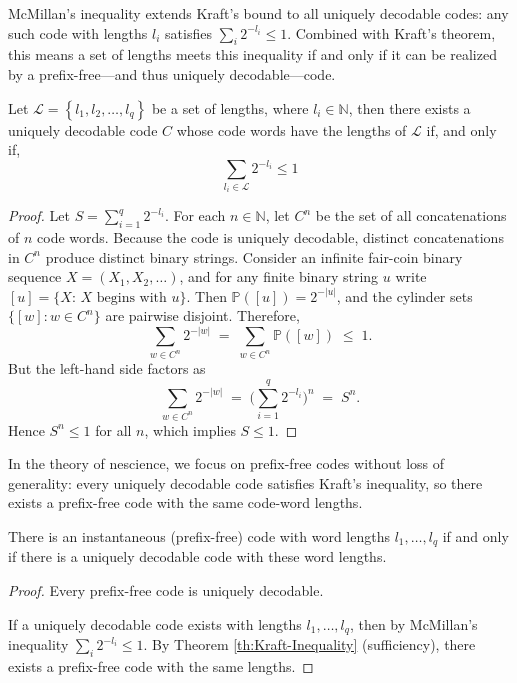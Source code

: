 McMillan's inequality extends Kraft's bound to all uniquely decodable codes: any such code with lengths \(l_i\) satisfies \(\sum_i 2^{-l_i}\le 1\). Combined with Kraft's theorem, this means a set of lengths meets this inequality if and only if it can be realized by a prefix-free---and thus uniquely decodable---code.

\begin{theorem}
\label{th:McMillan-Inequality}
Let $\mathcal{L}=\left\{ l_{1},l_{2},\ldots,l_{q}\right\}$ be a set of lengths, where $l_{i}\in\mathbb{N}$, then there exists a uniquely decodable code $C$ whose code words have the lengths of $\mathcal{L}$ if, and only if,
\[
\sum_{l_{i}\in\mathcal{L}}2^{-l_{i}} \leq 1
\]
\end{theorem}
\begin{proof}
Let $S=\sum_{i=1}^q 2^{-l_i}$. For each $n\in\mathbb{N}$, let $C^n$ be the set of all concatenations of $n$ code words. Because the code is uniquely decodable, distinct concatenations in $C^n$ produce distinct binary strings. Consider an infinite fair-coin binary sequence $X=(X_1,X_2,\ldots)$, and for any finite binary string $u$ write $[u]=\{X:\, X \text{ begins with } u\}$. Then $\mathbb{P}([u])=2^{-|u|}$, and the cylinder sets $\{[w]: w\in C^n\}$ are pairwise disjoint. Therefore,
\[
\sum_{w\in C^n} 2^{-|w|} \;=\; \sum_{w\in C^n} \mathbb{P}([w]) \;\le\; 1.
\]
But the left-hand side factors as
\[
\sum_{w\in C^n} 2^{-|w|} \;=\; \Big(\sum_{i=1}^q 2^{-l_i}\Big)^n \;=\; S^n.
\]
Hence $S^n\le 1$ for all $n$, which implies $S\le 1$.
\end{proof}

In the theory of nescience, we focus on prefix-free codes without loss of generality: every uniquely decodable code satisfies Kraft's inequality, so there exists a prefix-free code with the same code-word lengths.

\begin{corollary}
There is an instantaneous (prefix-free) code with word lengths $l_1, \ldots, l_q$ if and only if there is a uniquely decodable code with these word lengths.
\end{corollary}
\begin{proof}
Every prefix-free code is uniquely decodable.

If a uniquely decodable code exists with lengths $l_1,\ldots,l_q$, then by McMillan's inequality $\sum_i 2^{-l_i}\le 1$. By Theorem \ref{th:Kraft-Inequality} (sufficiency), there exists a prefix-free code with the same lengths.
\end{proof}

